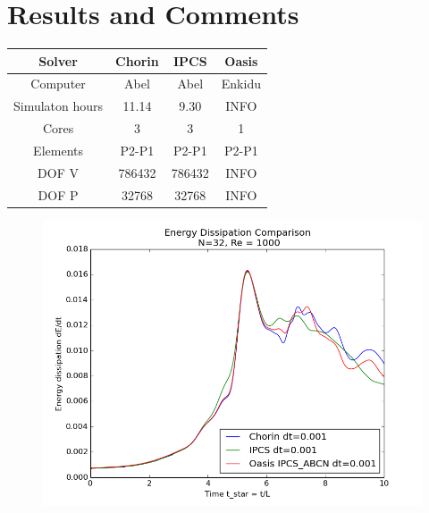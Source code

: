 \documentclass[a4paper,norsk]{article}
\begin{document}
\newpage
\section*{Results and Comments}
\begin{table}[h!]
\centering
\begin{tabular}{c|ccc}
\hline
\rowcolor{LightCyan}
Solver  &  Chorin & IPCS & Oasis\\
\hline
Computer & Abel    & Abel & Enkidu    \\ \hline
\rowcolor{LightCyan}
Simulaton hours & 11.14  & 9.30 & INFO  \\ \hline
Cores & 3 & 3  & 1  \\ \hline
\rowcolor{LightCyan}
Elements &P2-P1 & P2-P1 & P2-P1 \\ \hline
DOF V & 786432 & 786432 & INFO \\ \hline
\rowcolor{LightCyan}
DOF P & 32768 &  32768 & INFO \\
\hline
\end{tabular}
\end{table}

\begin{figure}[h!]
	\centering
    \includegraphics[scale=0.5]{results/plots/dkdt_dt001.png}
\end{figure}
\end{document}
